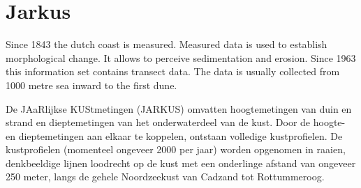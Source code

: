 \documentclass[9]{report}
\begin{document}
\section{ Jarkus }
\begin{description}
  \setlength{\itemsep}{4pt}
  \setlength{\parskip}{2pt}
  \setlength{\parsep}{2pt}
  \item[Abstract]  Since 1843 the dutch coast is measured. Measured data is used to establish morphological change. It allows to perceive sedimentation and erosion. 
Since 1963 this information set contains transect data. The data is usually collected from 1000 metre sea inward to the first dune. 

De JAaRlijkse KUStmetingen (JARKUS) omvatten hoogtemetingen van duin en strand en dieptemetingen van het onderwaterdeel van de kust. Door de hoogte- en dieptemetingen aan elkaar te koppelen, ontstaan volledige kustprofielen. De kustprofielen (momenteel ongeveer 2000 per jaar) worden opgenomen in raaien, denkbeeldige lijnen loodrecht op de kust met een onderlinge afstand van ongeveer 250 meter, langs de gehele Noordzeekust van Cadzand tot Rottummeroog.
 

\end{description}
\end{document}
